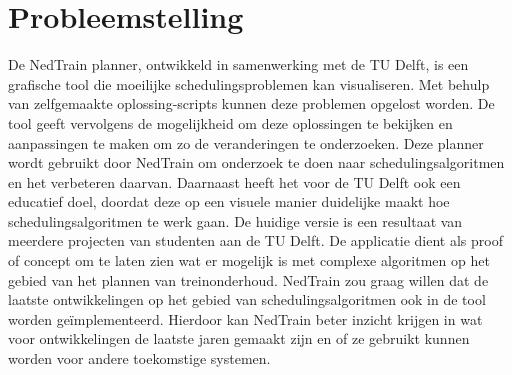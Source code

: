 \section{Probleemstelling}

De NedTrain planner, ontwikkeld in samenwerking met de TU Delft, is een grafische tool die moeilijke schedulingsproblemen kan visualiseren. Met behulp van zelfgemaakte oplossing-scripts kunnen deze problemen opgelost worden.
De tool geeft vervolgens de mogelijkheid om deze oplossingen te bekijken en aanpassingen te maken om zo de veranderingen te onderzoeken. Deze planner wordt gebruikt door NedTrain om onderzoek te doen naar schedulingsalgoritmen en het verbeteren daarvan.
Daarnaast heeft het voor de TU Delft ook een educatief doel, doordat deze op een visuele manier duidelijke maakt hoe schedulingsalgoritmen te werk gaan. De huidige versie is een resultaat van meerdere projecten van studenten aan de TU Delft. De applicatie dient als proof of concept om te laten zien wat er mogelijk is met complexe algoritmen op het gebied van het plannen van treinonderhoud.
NedTrain zou graag willen dat de laatste ontwikkelingen op het gebied van schedulingsalgoritmen ook in de tool worden ge\"implementeerd. Hierdoor kan NedTrain beter inzicht krijgen in wat voor ontwikkelingen de laatste jaren gemaakt zijn en of ze gebruikt kunnen worden voor andere toekomstige systemen.